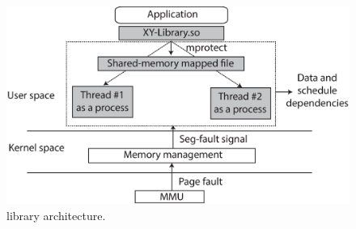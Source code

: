 
\begin{figure}[t]

\centering
      \includegraphics[scale=.35]{figure/Library-architecture}
  \caption{\projecttitle library architecture.}
   
  \label{fig:basicSystem}

\end{figure}
